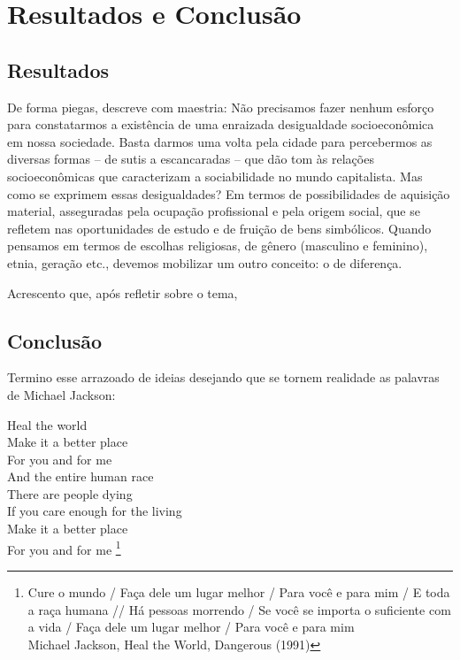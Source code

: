 \chapter{Resultados e Conclusão}

\section{Resultados}

De forma piegas,  descreve com maestria: Não precisamos fazer nenhum esforço para constatarmos a existência de uma
enraizada desigualdade socioeconômica em nossa sociedade. Basta darmos
uma volta pela cidade para percebermos as diversas formas – de sutis a escancaradas
– que dão tom às relações socioeconômicas que caracterizam a sociabilidade
no mundo capitalista. Mas como se exprimem essas desigualdades?
Em termos de possibilidades de aquisição material, asseguradas pela ocupação
profissional e pela origem social, que se refletem nas oportunidades de
estudo e de fruição de bens simbólicos. Quando pensamos em termos de escolhas
religiosas, de gênero (masculino e feminino), etnia, geração etc., devemos
mobilizar um outro conceito: o de diferença.

Acrescento que, após refletir sobre o tema,


\section{Conclusão}

Termino esse arrazoado de ideias desejando que se tornem realidade as palavras de Michael Jackson:

\begin{citacao}
    Heal the world\\
    Make it a better place\\
    For you and for me\\
    And the entire human race\\

    There are people dying\\
    If you care enough for the living\\
    Make it a better place\\
    For you and for me \footnote{
        Cure o mundo / Faça dele um lugar melhor / Para você e para mim / E toda a raça humana //
        Há pessoas morrendo / Se você se importa o suficiente com a vida / Faça dele um lugar melhor / Para você e para mim \\
        Michael Jackson, Heal the World, Dangerous (1991)
    }
\end{citacao}
